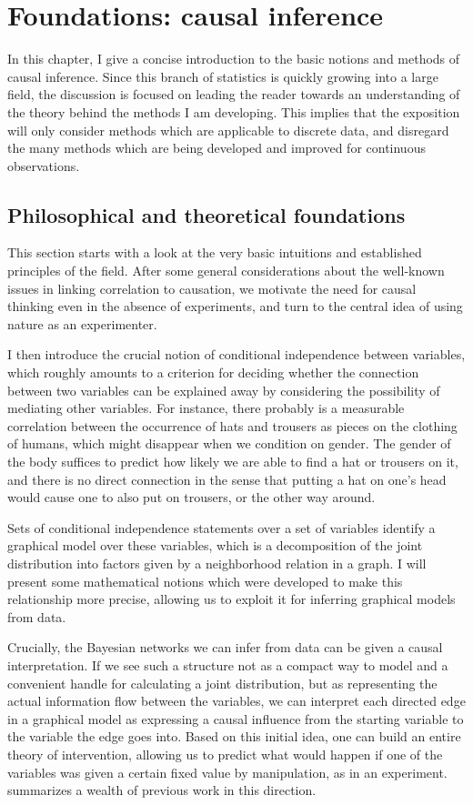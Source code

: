 \chapter{Foundations: causal inference}\label{sec:3}
In this chapter, I give a concise introduction to the basic notions and methods of causal inference. Since this branch of statistics is quickly growing into a large field, the discussion is focused on leading the reader towards an understanding of the theory behind the methods I am developing. This implies that the exposition will only consider methods which are applicable to discrete data, and disregard the many methods which are being developed and improved for continuous observations.

\section{Philosophical and theoretical foundations}\label{sec:3:1}
This section starts with a look at the very basic intuitions and established principles of the field. After some general considerations about the well-known issues in linking correlation to causation, we motivate the need for causal thinking even in the absence of experiments, and turn to the central idea of using nature as an experimenter.

I then introduce the crucial notion of conditional independence between variables, which roughly amounts to a criterion for deciding whether the connection between two variables can be explained away by considering the possibility of mediating other variables. For instance, there probably is a measurable correlation between the occurrence of hats and trousers as pieces on the clothing of humans, which might disappear when we condition on gender. The gender of the body suffices to predict how likely we are able to find a hat or trousers on it, and there is no direct connection in the sense that putting a hat on one's head would cause one to also put on trousers, or the other way around.

Sets of conditional independence statements over a set of variables identify a graphical model over these variables, which is a decomposition of the joint distribution into factors given by a neighborhood relation in a graph. I will present some mathematical notions which were developed to make this relationship more precise, allowing us to exploit it for inferring graphical models from data.

Crucially, the Bayesian networks we can infer from data can be given a causal interpretation. If we see such a structure not as a compact way to model and a convenient handle for calculating a joint distribution, but as representing the actual information flow between the variables, we can interpret each directed edge in a graphical model as expressing a causal influence from the starting variable to the variable the edge goes into. Based on this initial idea, one can build an entire theory of intervention, allowing us to predict what would happen if one of the variables was given a certain fixed value by manipulation, as in an experiment. \cite{pearl2009} summarizes a wealth of previous work in this direction.

